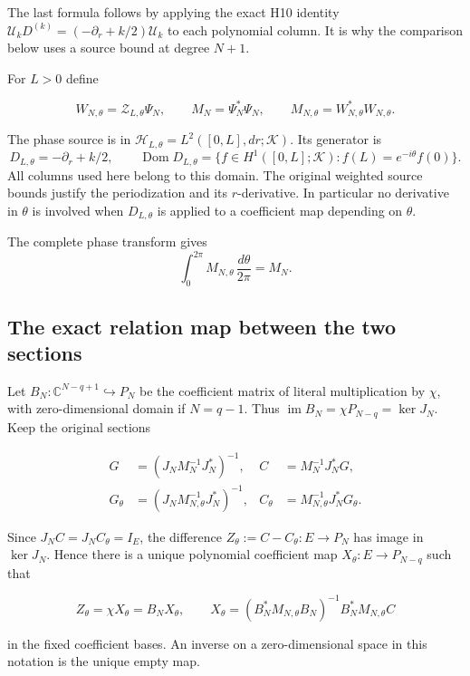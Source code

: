 The last formula follows by applying the exact H10 identity
\(\mathcal U_kD^{(k)}=(-\partial_r+k/2)\mathcal U_k\) to each polynomial column. It is why the comparison below uses a source bound at degree \(N+1\).

For \(L>0\) define

\[
 W_{N,\theta}=\mathcal Z_{L,\theta}\Psi_N,\qquad
 M_N=\Psi_N^*\Psi_N,\qquad
 M_{N,\theta}=W_{N,\theta}^*W_{N,\theta}.
 \tag{PSC.13}
\]

The phase source is in
\(\mathcal H_{L,\theta}=L^2([0,L],dr;\mathcal K)\).
Its generator is
\[
 D_{L,\theta}=-\partial_r+k/2,\qquad
 \operatorname{Dom}D_{L,\theta}
 =\{f\in H^1([0,L];\mathcal K):f(L)=e^{-i\theta}f(0)\}.
\]
All columns used here belong to this domain. The original weighted source bounds justify the periodization and its \(r\)-derivative. In particular no derivative in \(\theta\) is involved when \(D_{L,\theta}\) is applied to a coefficient map depending on \(\theta\).

The complete phase transform gives
\[
 \int_0^{2\pi}M_{N,\theta}\,\frac{d\theta}{2\pi}=M_N.
 \tag{PSC.14}
\]

\subsection{The exact relation map between the two sections}

Let \(B_N:\mathbb C^{N-q+1}\hookrightarrow P_N\) be the coefficient matrix of literal multiplication by \(\chi\), with zero-dimensional domain if \(N=q-1\). Thus
\(\operatorname{im}B_N=\chi P_{N-q}=\ker J_N\).
Keep the original sections

\[
 \begin{aligned}
 G&=(J_NM_N^{-1}J_N^*)^{-1},
 &C&=M_N^{-1}J_N^*G,\\
 G_\theta&=(J_NM_{N,\theta}^{-1}J_N^*)^{-1},
 &C_\theta&=M_{N,\theta}^{-1}J_N^*G_\theta .
 \end{aligned}
 \tag{PSC.15}
\]

Since \(J_NC=J_NC_\theta=I_E\), the difference
\(Z_\theta:=C-C_\theta:E\to P_N\) has image in \(\ker J_N\). Hence there is a unique polynomial coefficient map
\(X_\theta:E\to P_{N-q}\) such that

\[
 Z_\theta=\chi X_\theta=B_NX_\theta,\qquad
 X_\theta=(B_N^*M_{N,\theta}B_N)^{-1}
 B_N^*M_{N,\theta}C
 \tag{PSC.16}
\]

in the fixed coefficient bases. An inverse on a zero-dimensional space in this notation is the unique empty map.

